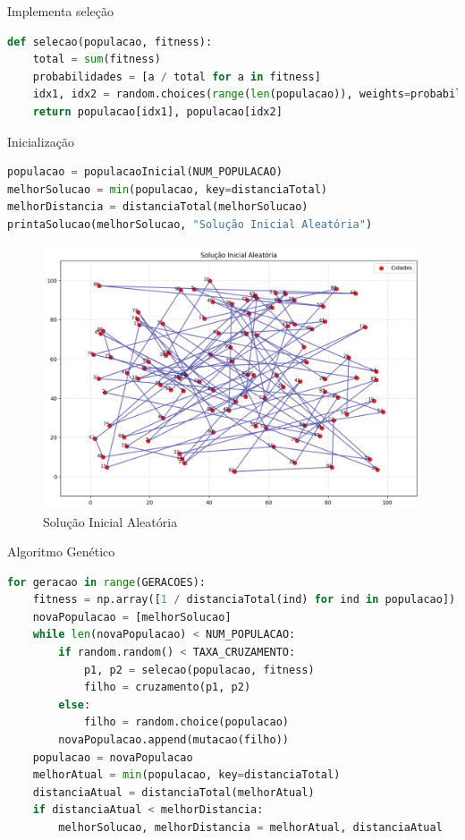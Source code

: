 Implementa seleção

\begin{lstlisting}[language=Python, style=input]
def selecao(populacao, fitness): 
    total = sum(fitness) 
    probabilidades = [a / total for a in fitness] 
    idx1, idx2 = random.choices(range(len(populacao)), weights=probabilidades, k=2) 
    return populacao[idx1], populacao[idx2]
\end{lstlisting}

Inicialização

\begin{lstlisting}[language=Python, style=input]
populacao = populacaoInicial(NUM_POPULACAO)
melhorSolucao = min(populacao, key=distanciaTotal)
melhorDistancia = distanciaTotal(melhorSolucao)
printaSolucao(melhorSolucao, "Solução Inicial Aleatória")
\end{lstlisting}

\begin{figure}[H]
\centering
\includegraphics[width=1\linewidth]{apendices/fig/IAA015_1.png}
\caption{Solução Inicial Aleatória}
\end{figure}

Algoritmo Genético

\begin{lstlisting}[language=Python, style=input]
for geracao in range(GERACOES): 
    fitness = np.array([1 / distanciaTotal(ind) for ind in populacao])
    novaPopulacao = [melhorSolucao]
    while len(novaPopulacao) < NUM_POPULACAO:
        if random.random() < TAXA_CRUZAMENTO:
            p1, p2 = selecao(populacao, fitness)
            filho = cruzamento(p1, p2)
        else:
            filho = random.choice(populacao)
        novaPopulacao.append(mutacao(filho))
    populacao = novaPopulacao
    melhorAtual = min(populacao, key=distanciaTotal)
    distanciaAtual = distanciaTotal(melhorAtual)
    if distanciaAtual < melhorDistancia:
        melhorSolucao, melhorDistancia = melhorAtual, distanciaAtual
\end{lstlisting}

